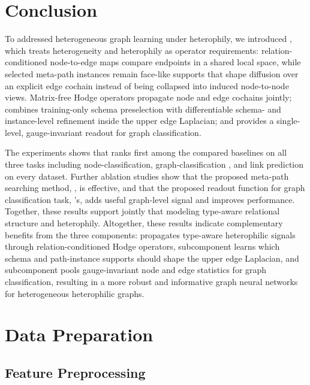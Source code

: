 \section{Conclusion}

To addressed heterogeneous graph learning under heterophily, we introduced \method{}, which treats heterogeneity and heterophily as operator requirements: relation-conditioned node-to-edge maps compare endpoints in a shared local space, while selected meta-path instances remain face-like supports that shape diffusion over an explicit edge cochain instead of being collapsed into induced node-to-node views. Matrix-free Hodge operators propagate node and edge cochains jointly; \ampss{} combines training-only schema preselection with differentiable schema- and instance-level refinement inside the upper edge Laplacian; and \sheafcovpool{} provides a single-level, gauge-invariant readout for graph classification.

The experiments shows that \method{} ranks first among the compared baselines on all three tasks including node-classification, graph-classification , and link prediction on every dataset. Further ablation studies show that the proposed meta-path searching method, \ampss{},  is effective, and that the proposed readout function for graph classification task, \sheafcovpool{}'s, adds useful graph-level signal and improves performance. Together, these results support jointly that modeling type-aware relational structure and heterophily. Altogether, these results indicate complementary benefits from the three components: \method{}
propagates type-aware heterophilic signals through relation-conditioned Hodge operators, \ampss{} subcomponent
learns which schema and path-instance supports should shape the upper edge Laplacian, and
\sheafcovpool{} subcomponent pools gauge-invariant node and edge statistics for graph classification, resulting in a more robust and informative graph neural networks for heterogeneous heterophilic graphs.




\appendix

\section{Data Preparation}
\label{sec:data-prep}
\subsection{Feature Preprocessing}

